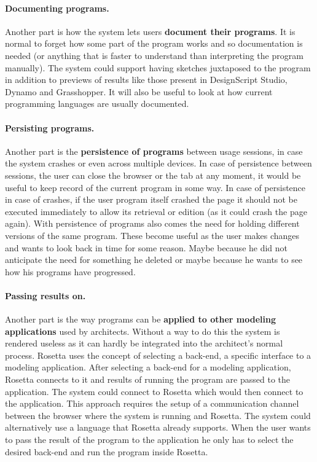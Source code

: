 \documentclass{./llncs2e/llncs}
\begin{document}
	\paragraph{Documenting programs.}
	Another part is how the system lets users \textbf{document their programs}. 
	It is normal to forget how some part of the program works and so documentation is needed (or anything that is faster to understand than interpreting the program manually).
	The system could support having sketches juxtaposed to the program in addition to previews of results like those present in DesignScript Studio, Dynamo and Grasshopper. 
	It will also be useful to look at how current programming languages are usually documented. 

	\paragraph{Persisting programs.}
	Another part is the \textbf{persistence of programs} between usage sessions, in case the system crashes or even across multiple devices.
	In case of persistence between sessions, the user can close the browser or the tab at any moment, it would be useful to keep record of the current program in some way. 
	In case of persistence in case of crashes, if the user program itself crashed the page it should not be executed immediately to allow its retrieval or edition (as it could crash the page again). 
	With persistence of programs also comes the need for holding different versions of the same program. 
	These become useful as the user makes changes and wants to look back in time for some reason. 
	Maybe because he did not anticipate the need for something he deleted or maybe because he wants to see how his programs have progressed.

	\paragraph{Passing results on.}
	Another part is the way programs can be \textbf{applied to other modeling applications} used by architects.
	Without a way to do this the system is rendered useless as it can hardly be integrated into the architect's normal process. 
	Rosetta uses the concept of selecting a back-end, a specific interface to a modeling application. 
	After selecting a back-end for a modeling application, Rosetta connects to it and results of running the program are passed to the application. 
	The system could connect to Rosetta which would then connect to the application. 
	This approach requires the setup of a communication channel between the browser where the system is running and Rosetta. 
	The system could alternatively use a language that Rosetta already supports. 
	When the user wants to pass the result of the program to the application he only has to select the desired back-end and run the program inside Rosetta.
\end{document}
